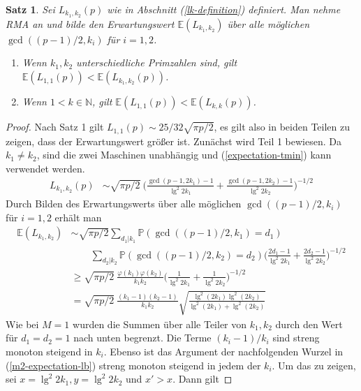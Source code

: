\documentclass[a4paper, 11pt, ngerman]{article}
\newcommand{\E}{\mathbb{E}}
\newcommand{\N}{\mathbb{N}}
\renewcommand{\P}{\mathbb{P}}
\theoremstyle{definition}
\theoremstyle{plain}
\newtheorem{theorem}{Satz}
\theoremstyle{remark}
\begin{document}
\begin{theorem}
    \label{theorem:optimal-k-m2}
    Sei $L_{k_1, k_2}(p)$ wie in Abschnitt (\ref{lk-definition}) definiert. Man nehme RMA an und bilde den Erwartungswert $\E(L_{k_1, k_2})$ über alle möglichen $\gcd((p - 1)/2, k_i)$ für $i = 1, 2$.
    \begin{enumerate}
        \item Wenn $k_1, k_2$ unterschiedliche Primzahlen sind, gilt $\E(L_{1, 1}(p)) < \E(L_{k_1, k_2}(p))$.
        \item Wenn $1 < k \in \N$, gilt $\E(L_{1, 1}(p)) < \E(L_{k, k}(p))$.
    \end{enumerate}
\end{theorem}

\begin{proof}
    Nach Satz 1 gilt $L_{1, 1}(p) \sim 25/32 \sqrt{\pi p /2}$, es gilt also in beiden Teilen zu zeigen, dass der Erwartungswert größer ist. Zunächst wird Teil 1 bewiesen. Da $k_1 \ne k_2$, sind die zwei Maschinen unabhängig und (\ref{expectation-tmin}) kann verwendet werden.
    \begin{align*}
        L_{k_1, k_2}(p)
         & \sim \sqrt{\pi p / 2} \
        \Bigg ( \frac {\gcd(p - 1, 2k_1) - 1} {\lg^2 2k_1} +
        \frac {\gcd(p -1, 2k_2) - 1} {\lg^2 2k_2} \Bigg )^{-1/2}
    \end{align*}
    Durch Bilden des Erwartungswerts über alle möglichen $\gcd((p - 1)/2, k_i)$ für $i = 1, 2$ erhält man
    \begin{align}
        \E(L_{k_1, k_2})
         & \sim \sqrt{\pi p / 2}
        \sum_{d_1 | k_1} \P(\gcd((p - 1)/2, k_1) = d_1)
        \nonumber                                                 \\
         & \qquad \sum_{d_2 | k_2} \P(\gcd((p - 1)/2, k_2) = d_2)
        \Bigg ( \frac {2d_1 - 1} {\lg^2 2k_1}
        + \frac {2d_2 - 1} {\lg^2 2k_2} \Bigg )^{-1/2}
        \nonumber                                                 \\
         & \ge \sqrt{\pi p / 2} \
        \frac {\varphi(k_1) \varphi(k_2)} {k_1k_2}
        \Bigg (\frac 1 {\lg^2 2k_1} + \frac 1 {\lg^2 2k_2} \Bigg )^{-1/2}
        \nonumber                                                 \\
         & = \sqrt{\pi p / 2} \
        \frac {(k_1 - 1) (k_2- 1)} {k_1k_2}
        \sqrt{\frac{\lg^2(2k_1) \lg^2(2k_2)}{\lg^2(2k_1) + \lg^2(2k_2)}}
        \label{m2-expectation-lb}
    \end{align}
    Wie bei $M = 1$ wurden die Summen über alle Teiler von $k_1, k_2$ durch den Wert für $d_1 = d_2 = 1$ nach unten begrenzt. Die Terme $(k_i - 1)/k_i$ sind streng monoton steigend in $k_i$. Ebenso ist das Argument der nachfolgenden Wurzel in (\ref{m2-expectation-lb}) streng monoton steigend in jedem der $k_i$. Um das zu zeigen, sei $x = \lg^2 2k_1, y = \lg^2 2k_2$ und $x' > x$. Dann gilt

\end{proof}
\end{document}

